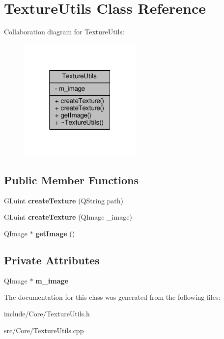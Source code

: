 \hypertarget{class_texture_utils}{\section{Texture\-Utils Class Reference}
\label{class_texture_utils}
}


Collaboration diagram for Texture\-Utils\-:
\nopagebreak
\begin{figure}[H]
\begin{center}
\leavevmode
\includegraphics[width=172pt]{class_texture_utils__coll__graph}
\end{center}
\end{figure}
\subsection*{Public Member Functions}
\begin{DoxyCompactItemize}
\item 
\hypertarget{class_texture_utils_a75333b11042058b34d7a1654a2addcbe}{G\-Luint {\bfseries create\-Texture} (Q\-String path)}\label{class_texture_utils_a75333b11042058b34d7a1654a2addcbe}

\item 
\hypertarget{class_texture_utils_ab7b92c71b02c3869975f2148cb1b4ad1}{G\-Luint {\bfseries create\-Texture} (Q\-Image \-\_\-image)}\label{class_texture_utils_ab7b92c71b02c3869975f2148cb1b4ad1}

\item 
\hypertarget{class_texture_utils_a9ee0b9da152562bbfcfa52e93f458918}{Q\-Image $\ast$ {\bfseries get\-Image} ()}\label{class_texture_utils_a9ee0b9da152562bbfcfa52e93f458918}

\end{DoxyCompactItemize}
\subsection*{Private Attributes}
\begin{DoxyCompactItemize}
\item 
\hypertarget{class_texture_utils_a67966ef63eefd0aed8c7af324fb7d5ca}{Q\-Image $\ast$ {\bfseries m\-\_\-image}}\label{class_texture_utils_a67966ef63eefd0aed8c7af324fb7d5ca}

\end{DoxyCompactItemize}


The documentation for this class was generated from the following files\-:\begin{DoxyCompactItemize}
\item 
include/\-Core/Texture\-Utils.\-h\item 
src/\-Core/Texture\-Utils.\-cpp\end{DoxyCompactItemize}
